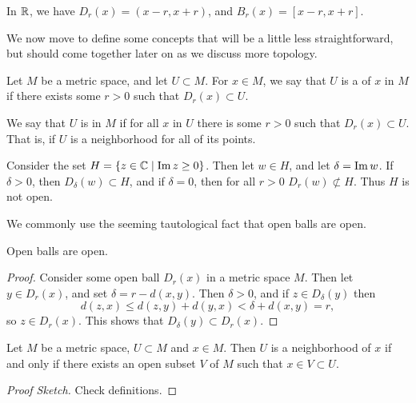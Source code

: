 \documentclass[a4paper]{scrartcl}
\begin{document}
\begin{example}
    In $\mathbb{R}$, we have $D_r(x) = (x - r, x + r)$, and $B_r(x) = [x - r, x + r]$.
\end{example}

We now move to define some concepts that will be a little less straightforward, but should come together later on as we discuss more topology.

\begin{definition}[Neighborhood]
    Let $M$ be a metric space, and let $U \subset M$. For $x \in M$, we say that $U$ is a  of $x$ in $M$ if there exists some $r > 0$ such that $D_r(x) \subset U$.
\end{definition}
\begin{definition}[Open]
    We say that $U$ is  in $M$ if for all $x$ in $U$ there is some $r > 0$ such that $D_r(x) \subset U$. That is, if $U$ is a neighborhood for all of its points.
\end{definition}

\begin{example}
    Consider the set $H = \{z \in \mathbb{C} \mid \operatorname{Im} z \geq 0 \}$.
    Then let $w \in H$, and let $\delta = \operatorname{Im} w$. If $\delta > 0$, then $D_{\delta}(w) \subset H$, and if $\delta = 0$, then for all $r > 0$ $D_r(w) \not \subset H$. Thus $H$ is not open.
\end{example}

We commonly use the seeming tautological fact that open balls are open.

\begin{lemma}
    Open balls are open.
\end{lemma}
\begin{proof}
    Consider some open ball $D_r(x)$ in a metric space $M$. Then let $y \in D_r(x)$, and set $\delta = r - d(x, y)$. Then $\delta >0$, and if $z \in D_{\delta}(y)$ then
    $$
    d(z, x) \leq d(z, y) + d(y, x) < \delta + d(x, y) = r,
    $$
    so $z \in D_r(x)$. This shows that $D_{\delta}(y) \subset D_r(x)$.
\end{proof}

\begin{corollary}
    Let $M$ be a metric space, $U \subset M$ and $x \in M$. Then $U$ is a neighborhood of $x$ if and only if there exists an open subset $V$ of $M$ such that $x \in V \subset U$.
\end{corollary}
\begin{proof}[Proof Sketch]
    Check definitions.
\end{proof}
\end{document}
